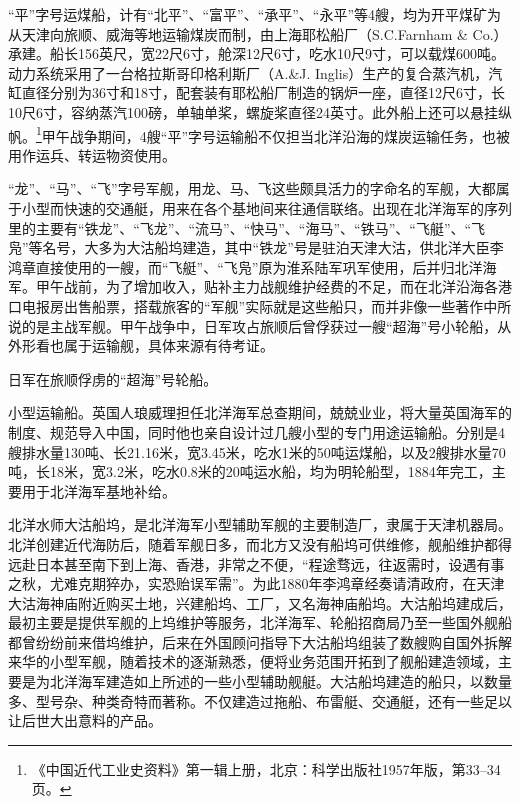 \documentclass[12pt,UTF8]{ctexbook}
\begin{document}
“平”字号运煤船，计有“北平”、“富平”、“承平”、“永平”等4艘，均为开平煤矿为从天津向旅顺、威海等地运输煤炭而制，由上海耶松船厂（S.C.Farnham \& Co.）承建。船长156英尺，宽22尺6寸，舱深12尺6寸，吃水10尺9寸，可以载煤600吨。动力系统采用了一台格拉斯哥印格利斯厂（A.\&J. Inglis）生产的复合蒸汽机，汽缸直径分别为36寸和18寸，配套装有耶松船厂制造的锅炉一座，直径12尺6寸，长10尺6寸，容纳蒸汽100磅，单轴单桨，螺旋桨直径24英寸。此外船上还可以悬挂纵帆。\footnote{《中国近代工业史资料》第一辑上册，北京：科学出版社1957年版，第33--34页。}甲午战争期间，4艘“平”字号运输船不仅担当北洋沿海的煤炭运输任务，也被用作运兵、转运物资使用。

“龙”、“马”、“飞”字号军舰，用龙、马、飞这些颇具活力的字命名的军舰，大都属于小型而快速的交通艇，用来在各个基地间来往通信联络。出现在北洋海军的序列里的主要有“铁龙”、“飞龙”、“流马”、“快马”、“海马”、“铁马”、“飞艇”、“飞凫”等名号，大多为大沽船坞建造，其中“铁龙”号是驻泊天津大沽，供北洋大臣李鸿章直接使用的一艘，而“飞艇”、“飞凫”原为淮系陆军巩军使用，后并归北洋海军。甲午战前，为了增加收入，贴补主力战舰维护经费的不足，而在北洋沿海各港口电报房出售船票，搭载旅客的“军舰”实际就是这些船只，而并非像一些著作中所说的是主战军舰。甲午战争中，日军攻占旅顺后曾俘获过一艘“超海”号小轮船，从外形看也属于运输舰，具体来源有待考证。

日军在旅顺俘虏的“超海”号轮船。

小型运输船。英国人琅威理担任北洋海军总查期间，兢兢业业，将大量英国海军的制度、规范导入中国，同时他也亲自设计过几艘小型的专门用途运输船。分别是4艘排水量130吨、长21.16米，宽3.45米，吃水1米的50吨运煤船，以及2艘排水量70吨，长18米，宽3.2米，吃水0.8米的20吨运水船，均为明轮船型，1884年完工，主要用于北洋海军基地补给。

北洋水师大沽船坞，是北洋海军小型辅助军舰的主要制造厂，隶属于天津机器局。北洋创建近代海防后，随着军舰日多，而北方又没有船坞可供维修，舰船维护都得远赴日本甚至南下到上海、香港，非常之不便，“程途骛远，往返需时，设遇有事之秋，尤难克期猝办，实恐贻误军需”。为此1880年李鸿章经奏请清政府，在天津大沽海神庙附近购买土地，兴建船坞、工厂，又名海神庙船坞。大沽船坞建成后，最初主要是提供军舰的上坞维护等服务，北洋海军、轮船招商局乃至一些国外舰船都曾纷纷前来借坞维护，后来在外国顾问指导下大沽船坞组装了数艘购自国外拆解来华的小型军舰，随着技术的逐渐熟悉，便将业务范围开拓到了舰船建造领域，主要是为北洋海军建造如上所述的一些小型辅助舰艇。大沽船坞建造的船只，以数量多、型号杂、种类奇特而著称。不仅建造过拖船、布雷艇、交通艇，还有一些足以让后世大出意料的产品。
\end{document}
